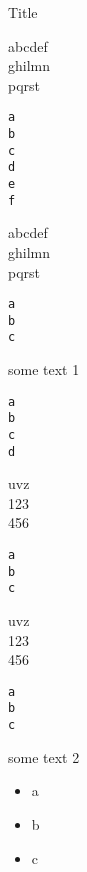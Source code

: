 \documentclass[9pt]{beamer}
\begin{document}
\begin{frame}{Title}

abcdef\\
ghilmn\\
pqrst
\begin{lstlisting}
a
b
c
d
e
f
\end{lstlisting}

abcdef\\
ghilmn\\
pqrst
\begin{lstlisting}
a
b
c
\end{lstlisting}

\framebreak
some text 1
\begin{lstlisting}
a
b
c
d
\end{lstlisting}

uvz\\
123\\
456
\begin{lstlisting}
a
b
c
\end{lstlisting}

uvz\\
123\\
456
\begin{lstlisting}
a
b
c
\end{lstlisting}

\framebreak
some text 2
\begin{itemize}
\item a
\item b
\item c
\end{itemize}

\end{frame}
\end{document}
